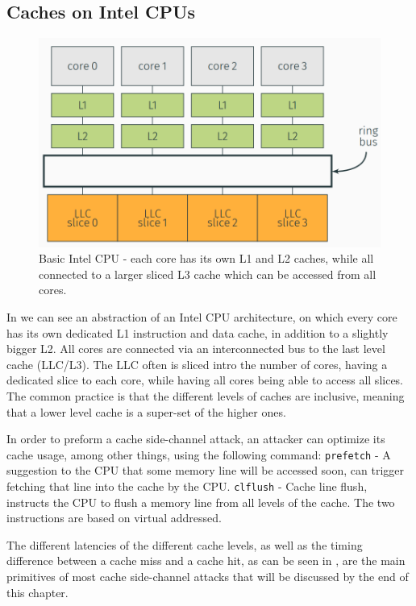 \subsection{Caches on Intel CPUs}
\label{subsec:cachesonintelcpus}
\begin{figure}
    \centering
    \includegraphics[width=\textwidth]{images/chapter_6/IntelCPU.PNG}
    \caption{Basic Intel CPU - each core has its own L1 and L2 caches, while all connected to a larger sliced L3 cache which can be accessed from all cores. }
    \label{fig:IntelCPU}
\end{figure}

In  we can see an abstraction of an Intel CPU architecture,
on which every core has its own dedicated L1 instruction and data cache, in
addition to a slightly bigger L2. All cores are connected via an interconnected
bus to the last level cache (LLC/L3). The LLC often is sliced intro the number
of cores, having a dedicated slice to each core, while having all cores being
able to access all slices. The common practice is that the different levels of
caches are inclusive, meaning that a lower level cache is a super-set of the
higher ones.  

In order to preform a cache side-channel attack, an attacker can optimize its
cache usage, among other things, using the following command: \texttt{prefetch}
- A suggestion to the CPU that some memory line will be accessed soon, can
trigger fetching that line into the cache by the CPU. \texttt{clflush} - Cache
line flush, instructs the CPU to flush a memory line from all levels of the
cache. The two instructions are based on virtual addressed.

The different latencies of the different cache levels, as well as the timing
difference between a cache miss and a cache hit, as can be seen in
, are the main primitives of most cache
side-channel attacks that will be discussed by the end of this chapter.  

